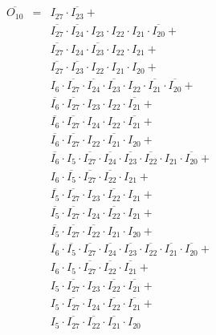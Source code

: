 \documentclass[a4paper,russian]{report}
\begin{document}
 \begin{eqnarray*}
    \overline{O_{10}} & = & I_{27} \cdotp \overline{I_{23}} + \\
	& &  \overline{I_{27}} \cdotp \overline{I_{24}} \cdotp I_{23} \cdotp I_{22} \cdotp I_{21} \cdotp \overline{I_{20}} + \\
	& &  \overline{I_{27}} \cdotp I_{24} \cdotp \overline{I_{23}} \cdotp I_{22} \cdotp I_{21} + \\
	& &  \overline{I_{27}} \cdotp \overline{I_{23}} \cdotp I_{22} \cdotp I_{21} \cdotp I_{20} + \\
	& &  I_{6} \cdotp \overline{I_{27}} \cdotp \overline{I_{24}} \cdotp \overline{I_{23}} \cdotp I_{22} \cdotp \overline{I_{21}} \cdotp \overline{I_{20}} + \\
	& &  \overline{I_{6}} \cdotp \overline{I_{27}} \cdotp I_{23} \cdotp I_{22} \cdotp \overline{I_{21}} + \\
	& &  \overline{I_{6}} \cdotp \overline{I_{27}} \cdotp I_{24} \cdotp I_{22} \cdotp \overline{I_{21}} + \\
	& &  \overline{I_{6}} \cdotp \overline{I_{27}} \cdotp I_{22} \cdotp \overline{I_{21}} \cdotp I_{20} + \\
	& &  \overline{I_{6}} \cdotp I_{5} \cdotp \overline{I_{27}} \cdotp \overline{I_{24}} \cdotp \overline{I_{23}} \cdotp \overline{I_{22}} \cdotp I_{21} \cdotp \overline{I_{20}} + \\
	& &  I_{6} \cdotp \overline{I_{5}} \cdotp \overline{I_{27}} \cdotp \overline{I_{22}} \cdotp I_{21} + \\
	& &  \overline{I_{5}} \cdotp \overline{I_{27}} \cdotp I_{23} \cdotp \overline{I_{22}} \cdotp I_{21} + \\
	& &  \overline{I_{5}} \cdotp \overline{I_{27}} \cdotp I_{24} \cdotp \overline{I_{22}} \cdotp I_{21} + \\
	& &  \overline{I_{5}} \cdotp \overline{I_{27}} \cdotp \overline{I_{22}} \cdotp I_{21} \cdotp I_{20} + \\
	& &  \overline{I_{6}} \cdotp \overline{I_{5}} \cdotp \overline{I_{27}} \cdotp \overline{I_{24}} \cdotp \overline{I_{23}} \cdotp \overline{I_{22}} \cdotp \overline{I_{21}} \cdotp \overline{I_{20}} + \\
	& &  I_{6} \cdotp I_{5} \cdotp \overline{I_{27}} \cdotp \overline{I_{22}} \cdotp \overline{I_{21}} + \\
	& &  I_{5} \cdotp \overline{I_{27}} \cdotp I_{23} \cdotp \overline{I_{22}} \cdotp \overline{I_{21}} + \\
	& &  I_{5} \cdotp \overline{I_{27}} \cdotp I_{24} \cdotp \overline{I_{22}} \cdotp \overline{I_{21}} + \\
	& &  I_{5} \cdotp \overline{I_{27}} \cdotp \overline{I_{22}} \cdotp \overline{I_{21}} \cdotp I_{20} \\
 \end{eqnarray*}
\pagebreak[1]
\end{document}
